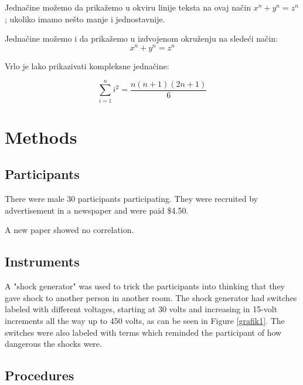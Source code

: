 \documentclass[conference]{IEEEtran}
\begin{document}
Jednačine možemo da prikažemo u okviru linije teksta na ovaj način \begin{math} x^n + y^n = z^n \end{math}; ukoliko imamo nešto manje i jednostavnije.

Jednačine možemo i da  prikažemo u izdvojenom okruženju na sledeći način:
\[ x^n + y^n = z^n \]

Vrlo je lako prikazivati kompleksne jednačine:

\[\sum\limits_{i=1}^n i^2 = \frac{n(n+1)(2n+1)}{6}\]

\section{Methods}
\label{sec_methods}

\subsection{Participants}
\label{subsec_participants}

There were male 30 participants participating. They were recruited by advertisement 
in a newspaper and were paid \$4.50. \cite{milgram1978obedience} %

A new paper \cite{pawlak1981information} showed no correlation.

\subsection{Instruments}
\label{subsec_instruments}

A "shock generator" was used to trick the participants into thinking that they gave 
shock to another person in another room. The shock generator had switches labeled with 
different voltages, starting at 30 volts\cite{simkin1981volcanoes} and increasing in 15-volt 
increments all the way up to 450 volts, as can be seen in Figure \ref{grafik1}. The switches 
were also labeled with terms which reminded the participant of how dangerous the shocks were.

\subsection{Procedures}
\label{subsec_procedures}
\end{document}
